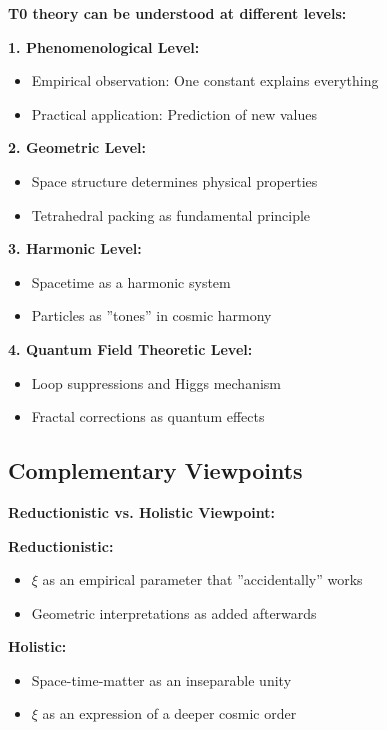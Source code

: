 \documentclass[12pt,a4paper]{article}
\begin{document}
	\begin{foundation}
		\textbf{T0 theory can be understood at different levels:}
		
		\textbf{1. Phenomenological Level:}
		\begin{itemize}
			\item Empirical observation: One constant explains everything
			\item Practical application: Prediction of new values
		\end{itemize}
		
		\textbf{2. Geometric Level:}
		\begin{itemize}
			\item Space structure determines physical properties
			\item Tetrahedral packing as fundamental principle
		\end{itemize}
		
		\textbf{3. Harmonic Level:}
		\begin{itemize}
			\item Spacetime as a harmonic system
			\item Particles as ''tones'' in cosmic harmony
		\end{itemize}
		
		\textbf{4. Quantum Field Theoretic Level:}
		\begin{itemize}
			\item Loop suppressions and Higgs mechanism
			\item Fractal corrections as quantum effects
		\end{itemize}
	\end{foundation}
	
	\subsection{Complementary Viewpoints}
	
	\begin{alternative}
		\textbf{Reductionistic vs. Holistic Viewpoint:}
		
		\textbf{Reductionistic:}
		\begin{itemize}
			\item $\xi$ as an empirical parameter that ''accidentally'' works
			\item Geometric interpretations as added afterwards
		\end{itemize}
		
		\textbf{Holistic:}
		\begin{itemize}
			\item Space-time-matter as an inseparable unity
			\item $\xi$ as an expression of a deeper cosmic order
		\end{itemize}
	\end{alternative}
	
\end{document}
